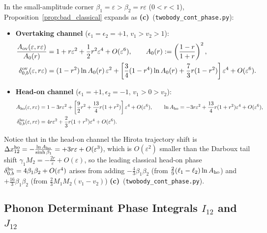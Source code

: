 \documentclass[11pt,a4paper]{article}
\newcommand{\Lc}{\textbf{(c)}}
\newcommand{\script}[1]{\texttt{#1}}
\begin{document}
In the small-amplitude corner $\beta_1=\varepsilon>\beta_2=r\varepsilon$ ($0<r<1$), Proposition~\ref{prop:bad_classical} expands as \Lc\ (\script{twobody\_cont\_phase.py}):
\begin{itemize}
\item \textbf{Overtaking channel} ($\epsilon_1=\epsilon_2=+1$, $v_1>v_2>1$):
\begin{align}
\frac{A_{\rm ov}(\varepsilon,r\varepsilon)}{A_0(r)}&=1+r\varepsilon^2+\frac12 r^2\varepsilon^4+O(\varepsilon^6),\qquad A_0(r):=\left(\frac{1-r}{1+r}\right)^2,\label{eq:A_ov_small}\\
\delta_{0,b}^{\rm ov}(\varepsilon,r\varepsilon)&=(1-r^2)\ln A_0(r)\,\varepsilon^2+\left[\frac34(1-r^4)\ln A_0(r)+\frac73 r(1-r^2)\right]\varepsilon^4+O(\varepsilon^6).\label{eq:d0_ov_small}
\end{align}
\item \textbf{Head-on channel} ($\epsilon_1=+1,\epsilon_2=-1$, $v_1>0>v_2$):
\begin{align}
A_{\rm ho}(\varepsilon,r\varepsilon)&=1-3r\varepsilon^2+\left[\frac92 r^2+\frac{13}{4}r(1+r^2)\right]\varepsilon^4+O(\varepsilon^6),\qquad
\ln A_{\rm ho}=-3r\varepsilon^2+\frac{13}{4}r(1+r^2)\varepsilon^4+O(\varepsilon^6),\label{eq:A_ho_small}\\
\delta_{0,b}^{\rm ho}(\varepsilon,r\varepsilon)&=4r\varepsilon^2+\frac23 r(1+r^2)\varepsilon^4+O(\varepsilon^6).\label{eq:d0_ho_small}
\end{align}
\end{itemize}
Notice that in the head-on channel the Hirota trajectory shift is $\Delta x_{12}^{\rm ho}=-\frac{\ln A_{\rm ho}}{\sinh\beta_1}=+3r\varepsilon+O(\varepsilon^3)$, which is $O(\varepsilon^2)$ smaller than the Darboux tail shift $\gamma_1 M_2=-\frac{2r}{\varepsilon}+O(\varepsilon)$, so the leading classical head-on phase $\delta_{0,b}^{\rm ho}=4\beta_1\beta_2+O(\varepsilon^4)$ arises from adding $-\frac43\beta_1\beta_2$ (from $\frac29(\ell_1-\ell_2)\ln A_{\rm ho}$) and $+\frac{16}{3}\beta_1\beta_2$ (from $\frac23 M_1 M_2(v_1-v_2)$) \Lc\ (\script{twobody\_cont\_phase.py}).

\subsection{Phonon Determinant Phase Integrals $I_{12}$ and $J_{12}$}
\end{document}
